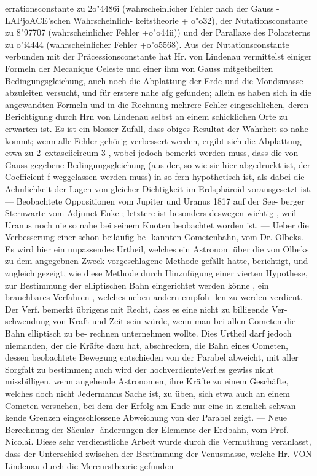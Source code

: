 \documentclass[12pt,a4paper]{article}
\begin{document}
{{{{{{{{errationsconstante  zu  2o"4486i  (wahrscheinlicher  Fehler  nach  der  Gauss -LAPjoACE'schen  Wahrscheinlich- keitstheorie +  o"o32),  der  Nutationsconstante  zu  8"97707  (wahrscheinlicher  Fehler  +o"o44ii))  und  der Parallaxe  des  Polarsterns  zu  o"i4444  (wahrscheinlicher  Fehler  +o"o5568).  Aus  der  Nutationsconstante verbunden  mit  der  Präcessionsconstante  hat  Hr.  von  Lindenau  vermittelst  einiger  Formeln  der  Mecanique Celeste  und  einer  ihm  von  Gauss  mitgetheilten  Bedingungsgleichung,  auch  noch  die  Abplattung  der Erde  und  die  Mondsmasse  abzuleiten  versucht,  und  für  erstere  nahe  afg  gefunden;  allein  es  haben  sich in  die  angewandten  Formeln  und  in  die  Rechnung  mehrere  Fehler  eingeschlichen,  deren  Berichtigung durch  Hrn  von  Lindenau  selbst  an  einem  schicklichen  Orte  zu  erwarten  ist.  Es  ist  ein  blosser  Zufall, dass  obiges  Resultat  der  Wahrheit  so  nahe  kommt;  wenn  alle  Fehler  gehörig  verbessert  werden,  ergibt sich  die  Abplattung  etwa  zu  2\	extasciicircum{}{ }3-,  wobei  jedoch  bemerkt  werden  muss,  dass  die  von  Gauss  gegebene Bedinguugsgleichung  (aus  der,  so  wie  sie  hier  abgedruckt  ist,  der  Coefficient  f  weggelassen  werden muss)  in  so  fern  hypothetisch  ist,  als  dabei  die  Aehnlichkeit  der  Lagen  von  gleicher  Dichtigkeit  im Erdsphäroid  vorausgesetzt  ist.  ---  Beobachtete  Oppositionen  vom  Jupiter  und  Uranus  1817  auf  der  See- berger  Sternwarte  vom  Adjunct  Enke  ;  letztere  ist  besonders  deswegen  wichtig ,  weil  Uranus  noch  nie so  nahe  bei  seinem  Knoten  beobachtet  worden  ist.  ---  Ueber  die  Verbesserung  einer  schon  beiläufig  be- kannten Cometenbahn,  vom  Dr.  Olbeks.  Es  wird  hier  ein  unpassendes  Urtheil,  welches  ein  Astronom über  die  von  Olbeks  zu  dem  angegebnen  Zweck  vorgeschlagene  Methode  gefällt  hatte,  berichtigt,  und zugleich  gezeigt,  wie  diese  Methode  durch  Hinzufügung  einer  vierten  Hypothese,  zur  Bestimmung  der elliptischen  Bahn  eingerichtet  werden  könne ,  ein  brauchbares  Verfahren ,  welches  neben  andern  empfoh- len zu  werden  verdient.  Der  Verf.  bemerkt  übrigens  mit  Recht,  dass  es  eine  nicht  zu  billigende  Ver- schwendung von  Kraft  und  Zeit  sein  würde,  wenn  man  bei  allen  Cometen  die  Bahn  elliptisch  zu  be- rechnen unternehmen  wollte.  Dies  Urtheil  darf  jedoch  niemanden,  der  die  Kräfte  dazu  hat,  abschrecken, die  Bahn  eines  Cometen,  dessen  beobachtete  Bewegung  entschieden  von  der  Parabel  abweicht,  mit  aller Sorgfalt  zu  bestimmen;  auch  wird  der  hochverdienteVerf.es  gewiss  nicht  missbilligen,  wenn  angehende Astronomen,  ihre  Kräfte  zu  einem  Geschäfte,  welches  doch  nicht  Jedermanns  Sache  ist,  zu  üben,  sich etwa  auch  an  einem  Cometen  versuchen,  bei  dem  der  Erfolg  am  Ende  nur  eine  in  ziemlich  schwan- kende Grenzen  eingeschlossene  Abweichung  von  der  Parabel  zeigt.  ---  Neue  Berechnung  der  Säcular- änderungen  der  Elemente  der  Erdbahn,  vom  Prof.  Nicolai.  Diese  sehr  verdienstliche  Arbeit  wurde  durch die  Vermuthung  veranlasst,  dass  der  Unterschied  zwischen  der  Bestimmung  der  Venusmasse,  welche  Hr. VON  Lindenau  durch  die  Mercurstheorie  gefunden }}}}}}}}
\end{document}
